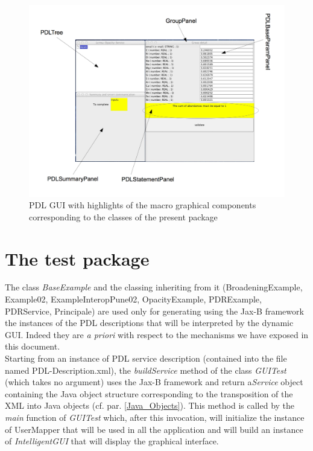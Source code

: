 \documentclass[a4paper,11pt] {ivoa}
\begin{document}
\begin{figure}[htbp]
\begin{center}
\hspace{-1cm}\includegraphics[width=1.2\textwidth]{pictures/PDLGui.jpg} 
\caption{PDL GUI with highlights of the macro graphical components corresponding to the classes of the present package}
\label{PDLGui.jpg}
\end{center}
\end{figure}

\section{The test package}
The class {\it BaseExample} and the classing inheriting from it (BroadeningExample, Example02, ExampleInteropPune02, OpacityExample, PDRExample, PDRService, Principale) are used only for generating using the Jax-B framework the instances of the PDL descriptions that will be interpreted by the dynamic GUI. Indeed they are {\it a priori} with respect to the mechanisms we have exposed in this document.\\

\noindent Starting from an instance of  PDL service description (contained into the file named PDL-Description.xml), the {\it buildService} method of the class {\it GUITest} (which takes no argument) uses the Jax-B framework and return a{\it Service} object containing the Java object structure corresponding to the transposition of the XML into Java objects (cf. par. \ref{Java_Objects}). This method is called by the {\it main} function of {\it GUITest} which, after this invocation,  will initialize the instance of {UserMapper} that will be used in all the application and will build an instance of {\it IntelligentGUI}  that will display the graphical interface.
\end{document}
